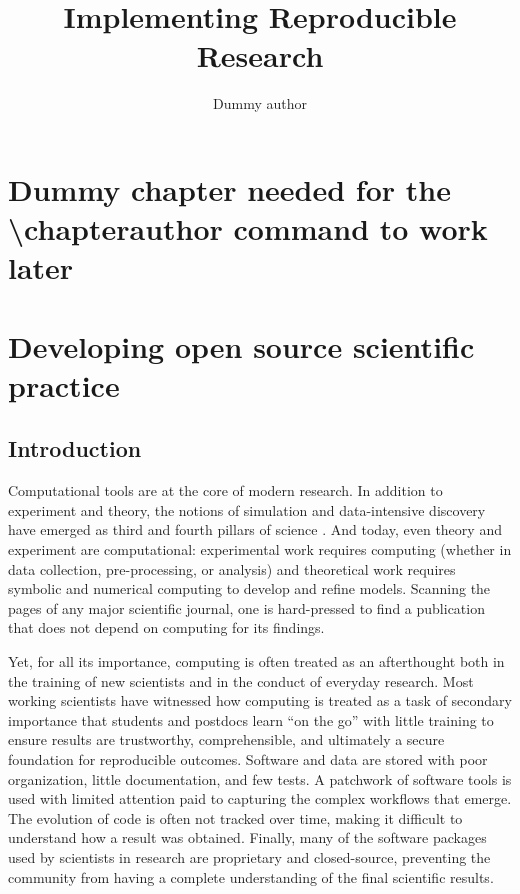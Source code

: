 \documentclass[ChapterTOCs,krantz2]{krantz} %
\theoremstyle{definition}
\begin{document}
\title{Implementing Reproducible Research}
\author{Dummy author}
\chapter*{Dummy chapter needed for the \textbackslash chapterauthor command to work later}

\mainmatter


\chapter{Developing open source scientific practice}

\section{Introduction}\label{intro}

Computational tools are at the core of modern research. In addition to
experiment and theory, the notions of simulation and data-intensive discovery
have emerged as third and fourth pillars of science \cite{4th-paradigm}.  And
today, even theory and experiment are computational: experimental work requires
computing (whether in data collection, pre-processing, or analysis) and
theoretical work requires symbolic and numerical computing to develop and
refine models. Scanning the pages of any major scientific journal, one is
hard-pressed to find a publication that does not depend on
computing for its findings.

Yet, for all its importance, computing is often treated as an afterthought both
in the training of new scientists and in the conduct of everyday research. Most
working scientists have witnessed how computing is treated as a task of
secondary importance that students and postdocs learn ``on the go'' with little
training to ensure results are trustworthy, comprehensible, and ultimately a
secure foundation for reproducible outcomes.  Software and data are stored with
poor organization, little documentation, and few tests.  A patchwork of
software tools is used with limited attention paid to capturing the complex
workflows that emerge.  The evolution of code is often not tracked over time,
making it difficult to understand how a result was obtained. Finally, many of
the software packages used by scientists in research are proprietary and
closed-source, preventing the community from having a complete understanding of
the final scientific results.
\end{document}
